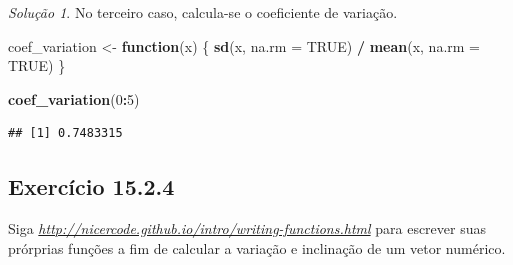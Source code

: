 \documentclass[
]{latex/krantz}
\newenvironment{Shaded}{\begin{snugshade}}{\end{snugshade}}
\newcommand{\AttributeTok}[1]{\textcolor[rgb]{0.13,0.29,0.53}{#1}}
\newcommand{\ConstantTok}[1]{\textcolor[rgb]{0.56,0.35,0.01}{#1}}
\newcommand{\ControlFlowTok}[1]{\textcolor[rgb]{0.13,0.29,0.53}{\textbf{#1}}}
\newcommand{\DecValTok}[1]{\textcolor[rgb]{0.00,0.00,0.81}{#1}}
\newcommand{\FunctionTok}[1]{\textcolor[rgb]{0.13,0.29,0.53}{\textbf{#1}}}
\newcommand{\NormalTok}[1]{#1}
\newcommand{\OtherTok}[1]{\textcolor[rgb]{0.56,0.35,0.01}{#1}}
\newcommand{\SpecialCharTok}[1]{\textcolor[rgb]{0.81,0.36,0.00}{\textbf{#1}}}
\theoremstyle{definition}
\theoremstyle{definition}
\theoremstyle{definition}
\theoremstyle{definition}
\theoremstyle{remark}
\newtheorem*{solution}{Solução}
\begin{document}
\begin{solution}
No terceiro caso, calcula-se o coeficiente de variação.

\begin{Shaded}
\begin{Highlighting}[]
\NormalTok{coef\_variation }\OtherTok{\textless{}{-}} \ControlFlowTok{function}\NormalTok{(x) \{}
  \FunctionTok{sd}\NormalTok{(x, }\AttributeTok{na.rm =} \ConstantTok{TRUE}\NormalTok{) }\SpecialCharTok{/} \FunctionTok{mean}\NormalTok{(x, }\AttributeTok{na.rm =} \ConstantTok{TRUE}\NormalTok{)}
\NormalTok{\}}

\FunctionTok{coef\_variation}\NormalTok{(}\DecValTok{0}\SpecialCharTok{:}\DecValTok{5}\NormalTok{)}
\end{Highlighting}
\end{Shaded}

\begin{verbatim}
## [1] 0.7483315
\end{verbatim}

\end{solution}

\hypertarget{exr15-2-4}{%
\subsection*{Exercício 15.2.4}\label{exr15-2-4}}

Siga \emph{\url{http://nicercode.github.io/intro/writing-functions.html}} para escrever suas prórprias funções a fim de calcular a variação e inclinação de um vetor numérico.
\end{document}
